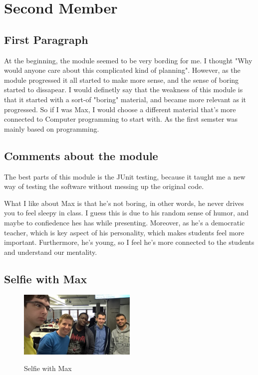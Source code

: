 \section{Second Member}
\subsection{First Paragraph}
At the beginning, the module seemed to be very bording for me. I thought "Why would anyone care about this complicated kind of planning". However, as the module progressed it all started to make more sense, and the sense of boring started to dissapear. I would definetly say that the weakness of this module is that it started with a sort-of "boring" material, and became more relevant as it progressed. So if I was Max, I would choose a different material that's more connected to Computer programming to start with. As the first semster was mainly based on programming.

\subsection{Comments about the module}
The best parts of this module is the JUnit testing, because it taught me a new way of testing the software without messing up the original code.

What I like about Max is that he's not boring, in other words, he never drives you to feel sleepy in class. I guess this is due to his random sense of humor, and maybe to confiedence hes has while presenting. Moreover, as he's a democratic teacher, which is key aspect of his personality, which makes students feel more important. Furthermore, he's young, so I feel he's more connected to the students and understand our mentality.

\subsection{Selfie with Max}
\begin{figure}[h]
\caption{Selfie with Max}
\centering
\includegraphics[width=0.5\textwidth]{pic.jpg}
\label{fig:selfie}
\end{figure}

